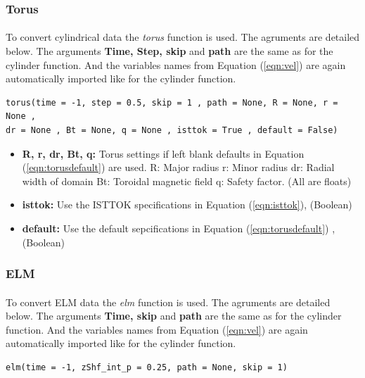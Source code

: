 \documentclass[12pt,a4paper]{article}
\begin{document}
\subsubsection{Torus}
\label{sec:vel_torus}
\paragraph{}
To convert cylindrical data the \textit{torus} function is used. The agruments are detailed below. The arguments \textbf{Time, Step, skip} and \textbf{path} are the same as for the cylinder function. And the variables names from Equation (\ref{eqn:vel}) are again automatically imported like for the cylinder function. 

\begin{verbatim}
torus(time = -1, step = 0.5, skip = 1 , path = None, R = None, r = None , 
dr = None , Bt = None, q = None , isttok = True , default = False)
\end{verbatim}

\begin{itemize}
	\item{\textbf{R, r, dr, Bt, q:} Torus settings if left blank defaults in Equation (\ref{eqn:torusdefault}) are used.
		R: Major radius
		r: Minor radius
		dr: Radial width of domain
		Bt: Toroidal magnetic field
		q: Safety factor. (All are floats)}
	\item{\textbf{isttok:} Use the ISTTOK specifications in Equation (\ref{eqn:isttok}), (Boolean)}
	\item{\textbf{default:} Use the default sepcifications in Equation (\ref{eqn:torusdefault}) , (Boolean)}
\end{itemize}

\subsubsection{ELM}
\label{sec:vel_elm}
\paragraph{}
To convert ELM data the \textit{elm} function is used. The agruments are detailed below. The arguments \textbf{Time, skip} and \textbf{path} are the same as for the cylinder function. And the variables names from Equation (\ref{eqn:vel}) are again automatically imported like for the cylinder function. 

\begin{verbatim}
elm(time = -1, zShf_int_p = 0.25, path = None, skip = 1)
\end{verbatim}
\end{document}
